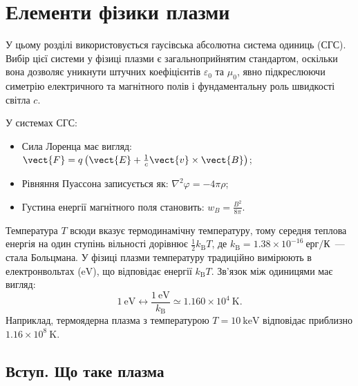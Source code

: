 
\chapter{Елементи фізики плазми}\label{\currfilebase}\hypertarget{PlasmaPhysics}{}
\graphicspath{{\currfilebase/Pictures}}

У цьому розділі використовується гаусівська абсолютна система одиниць (СГС). Вибір цієї системи у фізиці плазми є загальноприйнятим стандартом, оскільки вона дозволяє уникнути штучних коефіцієнтів $\varepsilon_0$ та $\mu_0$, явно підкреслюючи симетрію електричного та магнітного полів і фундаментальну роль швидкості світла $c$.

У системах СГС:
\begin{itemize}
	\item Сила Лоренца має вигляд: $\vect{F} = q\left(\vect{E} + \frac{1}{c}\vect{v}\times\vect{B}\right)$;
	\item Рівняння Пуассона записується як: $\nabla^2\varphi = -4\pi\rho$;
	\item Густина енергії магнітного поля становить: $w_B = \frac{B^2}{8\pi}$.
\end{itemize}

Температура $T$ всюди вказує термодинамічну температуру, тому середня теплова енергія на один ступінь вільності дорівнює $\frac{1}{2}k_{\mathrm B}T$, де $k_{\mathrm B} = 1.38\times10^{-16}~\text{ерг/К}$~--- стала Больцмана. У фізиці плазми температуру традиційно вимірюють в електронвольтах ($\mathrm{eV}$), що відповідає енергії $k_{\mathrm B}T$. Зв'язок між одиницями має вигляд:
\begin{equation}
	1~\mathrm{eV} \leftrightarrow \frac{1~\mathrm{eV}}{k_{\mathrm B}} \simeq 1.160\times10^4~\mathrm{K}.
\end{equation}
Наприклад, термоядерна плазма з температурою $T = 10~\mathrm{keV}$ відповідає приблизно $1.16\times10^8~\mathrm{K}$.

\section{Вступ. Що таке плазма}\label{sec:plasma-basics}\hypertarget{plasma-basics}{}

